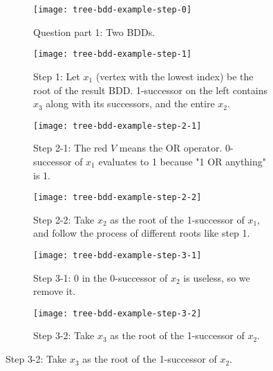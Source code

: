 \documentclass[../src/handouts/main.tex]{subfiles}
\begin{document}
\begin{figure}[htbp]
  \centering
  \begin{subfigure}[t]{.45\textwidth}
    \centering
    \texttt{[image: tree-bdd-example-step-0]}
    \caption{Question part 1: Two BDDs.}
    \label{fig:tree-bdd-op-example-step-0}
  \end{subfigure}
  \hfill
  \begin{subfigure}[t]{.45\textwidth}
    \centering
    \texttt{[image: tree-bdd-example-step-1]}
    \caption{Step 1: Let $x_1$ (vertex with the lowest index) be the root of the result BDD. 1-successor on the left contains $x_3$ along with its successors, and the entire $x_2$.}
    \label{fig:tree-bdd-op-example-step-1}
  \end{subfigure}

  \begin{subfigure}[t]{.45\textwidth}
    \centering
    \texttt{[image: tree-bdd-example-step-2-1]}
    \caption{Step 2-1: The red $V$ means the OR operator. 0-successor of $x_1$ evaluates to 1 because "1 OR anything" is 1.}
    \label{fig:tree-bdd-op-example-step-2-1}
  \end{subfigure}
  \hfill
  \begin{subfigure}[t]{.45\textwidth}
    \centering
    \texttt{[image: tree-bdd-example-step-2-2]}
    \caption{Step 2-2: Take $x_2$ as the root of the 1-successor of $x_1$, and follow the process of different roots like step 1.}
    \label{fig:tree-bdd-op-example-step-2-2}
  \end{subfigure}

  \begin{subfigure}[t]{.45\textwidth}
    \centering
    \texttt{[image: tree-bdd-example-step-3-1]}
    \caption{Step 3-1: 0 in the 0-successor of $x_2$ is useless, so we remove it.}
    \label{fig:tree-bdd-op-example-step-3-1}
  \end{subfigure}
  \hfill
  \begin{subfigure}[t]{.45\textwidth}
    \centering
    \texttt{[image: tree-bdd-example-step-3-2]}
    \caption{Step 3-2: Take $x_3$ as the root of the 1-successor of $x_2$.}
    \label{fig:tree-bdd-op-example-step-3-2}
  \end{subfigure}


\end{figure}
\end{document}
